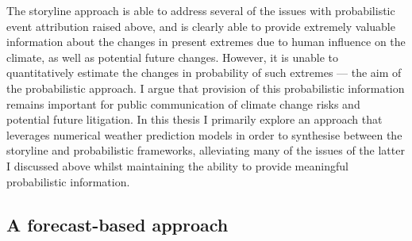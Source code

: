     The storyline approach is able to address several of the issues with probabilistic event attribution raised above, and is clearly able to provide extremely valuable information about the changes in present extremes due to human influence on the climate, as well as potential future changes. However, it is unable to quantitatively estimate the changes in probability of such extremes --- the aim of the probabilistic approach. I argue that provision of this probabilistic information remains important for public communication of climate change risks and potential future litigation. In this thesis I primarily explore an approach that leverages numerical weather prediction models in order to synthesise between the storyline and probabilistic frameworks, alleviating many of the issues of the latter I discussed above whilst maintaining the ability to provide meaningful probabilistic information.

  \subsection{A forecast-based approach}

